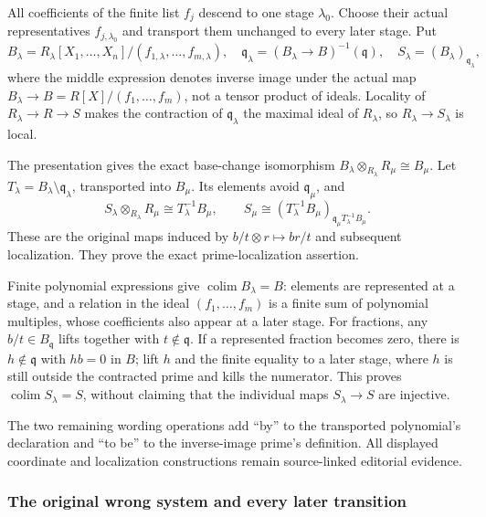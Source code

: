 All coefficients of the finite list \(f_j\) descend to one stage \(\lambda_0\). Choose their actual representatives \(f_{j,\lambda_0}\) and transport them unchanged to every later stage. Put \[
B_\lambda=R_\lambda[X_1,\ldots,X_n]/(f_{1,\lambda},\ldots,f_{m,\lambda}),
\quad
\mathfrak q_\lambda=(B_\lambda\to B)^{-1}(\mathfrak q),\quad
S_\lambda=(B_\lambda)_{\mathfrak q_\lambda},
\] where the middle expression denotes inverse image under the actual map \(B_\lambda\to B=R[X]/(f_1,\ldots,f_m)\), not a tensor product of ideals. Locality of \(R_\lambda\to R\to S\) makes the contraction of \(\mathfrak q_\lambda\) the maximal ideal of \(R_\lambda\), so \(R_\lambda\to S_\lambda\) is local.

The presentation gives the exact base-change isomorphism \(B_\lambda\otimes_{R_\lambda}R_\mu\cong B_\mu\). Let \(T_\lambda=B_\lambda\setminus\mathfrak q_\lambda\), transported into \(B_\mu\). Its elements avoid \(\mathfrak q_\mu\), and \[
S_\lambda\otimes_{R_\lambda}R_\mu
\cong T_\lambda^{-1}B_\mu,\qquad
S_\mu\cong(T_\lambda^{-1}B_\mu)_{\mathfrak q_\mu T_\lambda^{-1}B_\mu}.
\] These are the original maps induced by \(b/t\otimes r\mapsto br/t\) and subsequent localization. They prove the exact prime-localization assertion.

Finite polynomial expressions give \(\operatorname{colim}B_\lambda=B\): elements are represented at a stage, and a relation in the ideal \((f_1,\ldots,f_m)\) is a finite sum of polynomial multiples, whose coefficients also appear at a later stage. For fractions, any \(b/t\in B_{\mathfrak q}\) lifts together with \(t\notin\mathfrak q\). If a represented fraction becomes zero, there is \(h\notin\mathfrak q\) with \(hb=0\) in \(B\); lift \(h\) and the finite equality to a later stage, where \(h\) is still outside the contracted prime and kills the numerator. This proves \(\operatorname{colim}S_\lambda=S\), without claiming that the individual maps \(S_\lambda\to S\) are injective.

The two remaining wording operations add ``by'' to the transported polynomial's declaration and ``to be'' to the inverse-image prime's definition. All displayed coordinate and localization constructions remain source-linked editorial evidence.

\subsubsection{The original wrong system and every later transition}\label{algebra-proof-037-the-original-wrong-system-and-every-later-transition}


